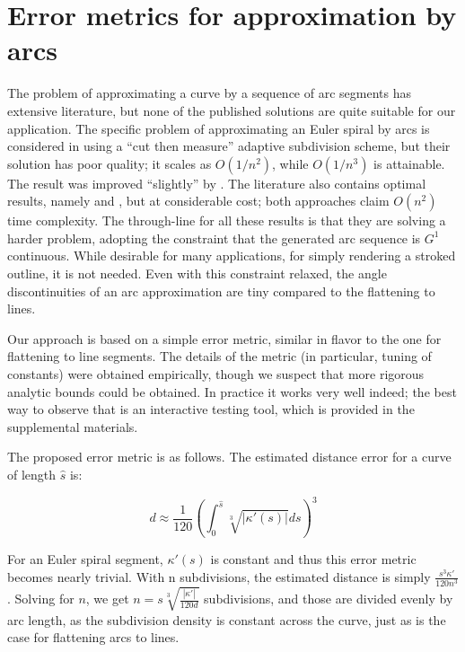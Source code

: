 \documentclass[format=acmsmall]{acmart}
\begin{document}
\section{Error metrics for approximation by arcs}

The problem of approximating a curve by a sequence of arc segments has extensive literature, but none of the published solutions are quite suitable for our application. The specific problem of approximating an Euler spiral by arcs is considered in \cite{Meek2004} using a ``cut then measure'' adaptive subdivision scheme, but their solution has poor quality; it scales as $O(1/n^2)$, while $O(1/n^3)$ is attainable. The result was improved ``slightly'' by \cite{Narayan2014}. The literature also contains optimal results, namely \cite{Maier2014} and \cite{Nuntawisuttiwong2021}, but at considerable cost; both approaches claim $O(n^2)$ time complexity. The through-line for all these results is that they are solving a harder problem, adopting the constraint that the generated arc sequence is $G^1$ continuous. While desirable for many applications, for simply rendering a stroked outline, it is not needed. Even with this constraint relaxed, the angle discontinuities of an arc approximation are tiny compared to the flattening to lines.


Our approach is based on a simple error metric, similar in flavor to the one for flattening to line segments. The details of the metric (in particular, tuning of constants) were obtained empirically, though we suspect that more rigorous analytic bounds could be obtained. In practice it works very well indeed; the best way to observe that is an interactive testing tool, which is provided in the supplemental materials.

The proposed error metric is as follows. The estimated distance error for a curve of length $\hat{s}$ is:

\[
    d \approx \frac{1}{120}\left(\int_0^{\hat{s}} \sqrt[3]{|\kappa'(s)|}ds \right)^3
\]

For an Euler spiral segment, $\kappa'(s)$ is constant and thus this error metric becomes nearly trivial. With n subdivisions, the estimated distance is simply $\frac{s^3\kappa'}{120n^3}$. Solving for $n$, we get $n = s\sqrt[3]{\frac{|\kappa'|}{120d}}$ subdivisions, and those are divided evenly by arc length, as the subdivision density is constant across the curve, just as is the case for flattening arcs to lines.
\end{document}

